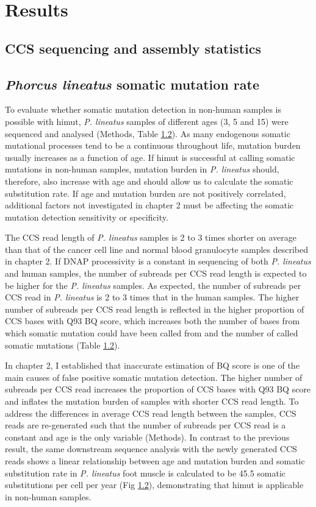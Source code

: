 \section{Results}

\subsection{CCS sequencing and assembly statistics}

\subsection{\textit{Phorcus lineatus} somatic mutation rate}

To evaluate whether somatic mutation detection in non-human samples is possible with himut, \textit{P. lineatus} samples of different ages (3, 5 and 15) were sequenced and analysed (Methods, Table \ref{}). As many endogenous somatic mutational processes tend to be a continuous throughout life, mutation burden usually increases as a function of age. If himut is successful at calling somatic mutations in non-human samples, mutation burden in \textit{P. lineatus} should, therefore, also increase with age and should allow us to calculate the somatic substitution rate. If age and mutation burden are not positively correlated, additional factors not investigated in chapter 2 must be affecting the somatic mutation detection sensitivity or specificity. 

The CCS read length of \textit{P. lineatus} samples is 2 to 3 times shorter on average than that of the cancer cell line and normal blood granulocyte samples described in chapter 2. If DNAP processivity is a constant in sequencing of both \textit{P. lineatus} and human samples, the number of subreads per CCS read length is expected to be higher for the \textit{P. lineatus} samples. As expected, the number of subreads per CCS read in \textit{P. lineatus} is 2 to 3 times that in the human samples. The higher number of subreads per CCS read length is reflected in the higher proportion of CCS bases with Q93 BQ score, which increases both the number of bases from which somatic mutation could have been called from and the number of called somatic mutations (Table \ref{}). 

In chapter 2, I established that inaccurate estimation of BQ score is one of the main causes of false positive somatic mutation detection. The higher number of subreads per CCS read increases the proportion of CCS bases with Q93 BQ score and inflates the mutation burden of samples with shorter CCS read length. To address the differences in average CCS read length between the samples, CCS reads are re-generated such that the number of subreads per CCS read is a constant and age is the only variable (Methods). In contrast to the previous result, the same downstream sequence analysis with the newly generated CCS reads shows a linear relationship between age and mutation burden and somatic substitution rate in \textit{P. lineatus} foot muscle is calculated to be 45.5 somatic substitutions per cell per year (Fig \ref{}), demonstrating that himut is applicable in non-human samples. 

